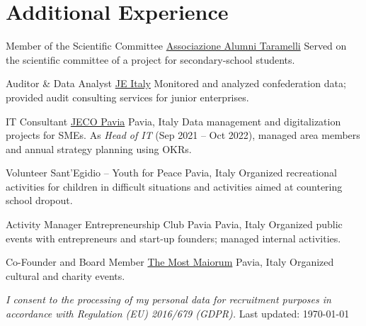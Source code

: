 \documentclass[11pt,a4paper,sans]{moderncv}
\begin{document}
\section{Additional Experience}

%
        {Member of the Scientific Committee}%
        {\href{https://www.alumnitaramelli.it/}{Associazione Alumni Taramelli}}%
        {}%
        {}%
        {Served on the scientific committee of a project for secondary-school students.}

%
        {Auditor \& Data Analyst}%
        {\href{https://jeitaly.org/}{JE Italy}}%
        {}%
        {}%
        {Monitored and analyzed confederation data; provided audit consulting services for junior enterprises.}

%
        {IT Consultant}%
        {\href{https://jecopavia.it/}{JECO Pavia}}%
        {Pavia, Italy}%
        {}%
        {Data management and digitalization projects for SMEs. As \emph{Head of IT} (Sep 2021 -- Oct 2022), managed area members and annual strategy planning using OKRs.}

%
        {Volunteer}%
        {Sant'Egidio -- Youth for Peace}%
        {Pavia, Italy}%
        {}%
        {Organized recreational activities for children in difficult situations and activities aimed at countering school dropout.}

%
        {Activity Manager}%
        {Entrepreneurship Club Pavia}%
        {Pavia, Italy}%
        {}%
        {Organized public events with entrepreneurs and start-up founders; managed internal activities.}

%
        {Co-Founder and Board Member}%
        {\href{https://www.themostmaiourm.aecserviziweb.com/}{The Most Maiorum}}%
        {Pavia, Italy}%
        {}%
        {Organized cultural and charity events.}



%

\enlargethispage{\baselineskip}

\vfill
\noindent
{\scriptsize
\textit{I consent to the processing of my personal data for recruitment purposes in accordance with Regulation (EU) 2016/679 (GDPR).}
\hfill
Last updated: \today
}
\end{document}
